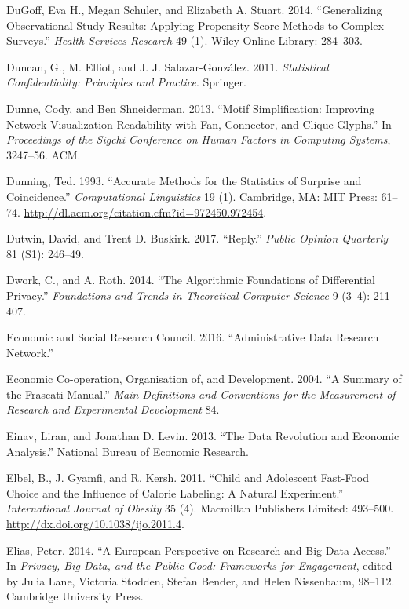 \documentclass[]{krantz}
\begin{document}
\hypertarget{ref-dugoff2014generalizing}{}
DuGoff, Eva H., Megan Schuler, and Elizabeth A. Stuart. 2014.
``Generalizing Observational Study Results: Applying Propensity Score
Methods to Complex Surveys.'' \emph{Health Services Research} 49 (1).
Wiley Online Library: 284--303.

\hypertarget{ref-duncanstatistical}{}
Duncan, G., M. Elliot, and J. J. Salazar-González. 2011.
\emph{Statistical Confidentiality: Principles and Practice}. Springer.

\hypertarget{ref-dunne2013motif}{}
Dunne, Cody, and Ben Shneiderman. 2013. ``Motif Simplification:
Improving Network Visualization Readability with Fan, Connector, and
Clique Glyphs.'' In \emph{Proceedings of the Sigchi Conference on Human
Factors in Computing Systems}, 3247--56. ACM.

\hypertarget{ref-Dunning-93}{}
Dunning, Ted. 1993. ``Accurate Methods for the Statistics of Surprise
and Coincidence.'' \emph{Computational Linguistics} 19 (1). Cambridge,
MA: MIT Press: 61--74.
\url{http://dl.acm.org/citation.cfm?id=972450.972454}.

\hypertarget{ref-dutwinbuskirk2017}{}
Dutwin, David, and Trent D. Buskirk. 2017. ``Reply.'' \emph{Public
Opinion Quarterly} 81 (S1): 246--49.

\hypertarget{ref-Dworkroth2014}{}
Dwork, C., and A. Roth. 2014. ``The Algorithmic Foundations of
Differential Privacy.'' \emph{Foundations and Trends in Theoretical
Computer Science} 9 (3--4): 211--407.

\hypertarget{ref-EconomicandSocialResearchCouncil2016}{}
Economic and Social Research Council. 2016. ``Administrative Data
Research Network.''

\hypertarget{ref-manual2004summary}{}
Economic Co-operation, Organisation of, and Development. 2004. ``A
Summary of the Frascati Manual.'' \emph{Main Definitions and Conventions
for the Measurement of Research and Experimental Development} 84.

\hypertarget{ref-einav2013data}{}
Einav, Liran, and Jonathan D. Levin. 2013. ``The Data Revolution and
Economic Analysis.'' National Bureau of Economic Research.

\hypertarget{ref-Elbel2011}{}
Elbel, B., J. Gyamfi, and R. Kersh. 2011. ``Child and Adolescent
Fast-Food Choice and the Influence of Calorie Labeling: A Natural
Experiment.'' \emph{International Journal of Obesity} 35 (4). Macmillan
Publishers Limited: 493--500.
\url{http://dx.doi.org/10.1038/ijo.2011.4}.

\hypertarget{ref-Elias2014}{}
Elias, Peter. 2014. ``A European Perspective on Research and Big Data
Access.'' In \emph{Privacy, Big Data, and the Public Good: Frameworks
for Engagement}, edited by Julia Lane, Victoria Stodden, Stefan Bender,
and Helen Nissenbaum, 98--112. Cambridge University Press.
\end{document}
